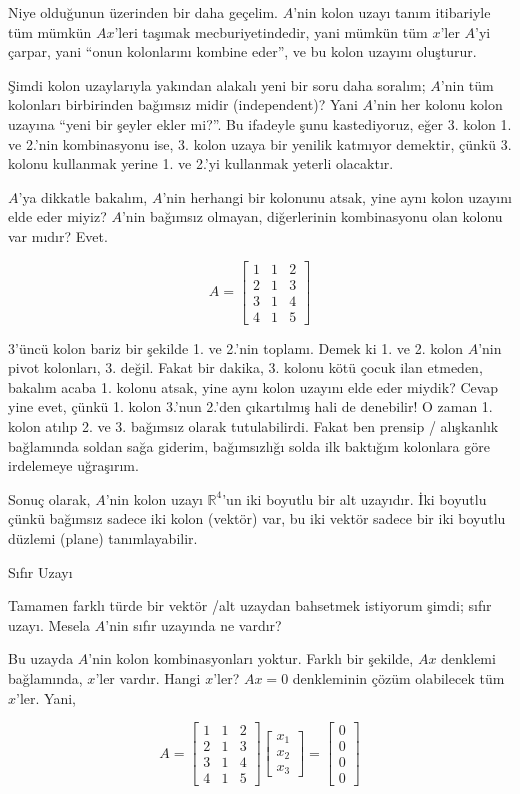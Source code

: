 \documentclass[12pt,fleqn]{article}\usepackage{../../common}
\begin{document}
Niye olduğunun üzerinden bir daha geçelim. $A$'nin kolon uzayı tanım
itibariyle tüm mümkün $Ax$'leri taşımak mecburiyetindedir, yani mümkün tüm
$x$'ler $A$'yi çarpar, yani ``onun kolonlarını kombine eder'', ve bu kolon
uzayını oluşturur. 

Şimdi kolon uzaylarıyla yakından alakalı yeni bir soru daha soralım;
$A$'nin tüm kolonları birbirinden bağımsız midir (independent)? Yani
$A$'nin her kolonu kolon uzayına ``yeni bir şeyler ekler mi?''. Bu ifadeyle
şunu kastediyoruz, eğer 3. kolon 1. ve 2.'nin kombinasyonu ise, 3. kolon
uzaya bir yenilik katmıyor demektir, çünkü 3. kolonu kullanmak yerine 1. ve
2.'yi kullanmak yeterli olacaktır. 

$A$'ya dikkatle bakalım, $A$'nin herhangi bir kolonunu atsak, yine aynı
kolon uzayını elde eder miyiz? $A$'nin bağımsız olmayan, diğerlerinin
kombinasyonu olan kolonu var mıdır? Evet. 

$$ A = 
\left[\begin{array}{rrr}
1 & 1 & 2 \\
2 & 1 & 3 \\
3 & 1 & 4 \\
4 & 1 & 5 
\end{array}\right]
$$

3'üncü kolon bariz bir şekilde 1. ve 2.'nin toplamı. Demek ki 1. ve 2. kolon
$A$'nin pivot kolonları, 3. değil. Fakat bir dakika, 3. kolonu kötü çocuk
ilan etmeden, bakalım acaba 1. kolonu atsak, yine aynı kolon uzayını elde
eder miydik? Cevap yine evet, çünkü 1. kolon 3.'nun 2.'den çıkartılmış hali
de denebilir! O zaman 1. kolon atılıp 2. ve 3. bağımsız olarak
tutulabilirdi. Fakat ben prensip / alışkanlık bağlamında  soldan
sağa giderim, bağımsızlığı solda ilk baktığım kolonlara göre
irdelemeye uğraşırım.

Sonuç olarak, $A$'nin kolon uzayı $\mathbb{R}^4$'un iki boyutlu bir alt
uzayıdır. İki boyutlu çünkü bağımsız sadece iki kolon (vektör) var, bu iki
vektör sadece bir iki boyutlu düzlemi (plane) tanımlayabilir. 

Sıfır Uzayı

Tamamen farklı türde bir vektör /alt uzaydan bahsetmek istiyorum şimdi; sıfır
uzayı. Mesela $A$'nin sıfır uzayında ne vardır? 

Bu uzayda $A$'nin kolon kombinasyonları yoktur. Farklı bir şekilde, $Ax$
denklemi bağlamında, $x$'ler vardır. Hangi $x$'ler? $Ax=0$ denkleminin çözüm
olabilecek tüm $x$'ler. Yani,

$$ A = 
\left[\begin{array}{rrr}
1 & 1 & 2 \\
2 & 1 & 3 \\
3 & 1 & 4 \\
4 & 1 & 5 
\end{array}\right]
\left[\begin{array}{r}
x_1  \\
x_2  \\
x_3  
\end{array}\right] 
=
\left[\begin{array}{r}
0  \\
0  \\
0  \\
0  
\end{array}\right]
 $$
\end{document}
